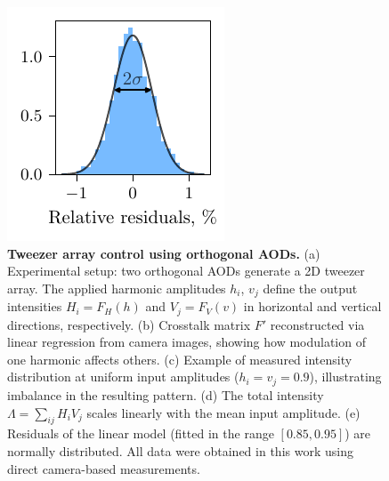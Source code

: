 \begin{figure}[h]
    \phantom{42}
    \includegraphics{fig-py/crosstalk-camera-res.pdf}
    \caption{
        \textbf{Tweezer array control using orthogonal AODs.}
        (a) Experimental setup: two orthogonal AODs generate a 2D tweezer array. The applied harmonic amplitudes $h_i$, $v_j$ define the output intensities $H_i = F_H(h)$ and $V_j = F_V(v)$ in horizontal and vertical directions, respectively. 
        (b) Crosstalk matrix $F'$ reconstructed via linear regression from camera images, showing how modulation of one harmonic affects others. 
        (c) Example of measured intensity distribution at uniform input amplitudes ($h_i = v_j = 0.9$), illustrating imbalance in the resulting pattern. 
        (d) The total intensity $\Lambda = \sum_{ij} H_i V_j$ scales linearly with the mean input amplitude. 
        (e) Residuals of the linear model (fitted in the range $[0.85, 0.95]$) are normally distributed. 
        All data were obtained in this work using direct camera-based measurements.
    }
    \label{fig:control}
\end{figure}

